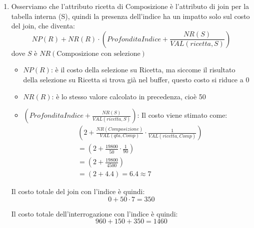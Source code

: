 \documentclass[a4paper]{article}
\begin{document}
\begin{exercise}
\begin{enumerate}
\begin{enumerate}
\begin{itemize}
            \item \( NP(S) \): è il numero di pagine del risultato della selezione su
              Composizione, che è 180
          \end{itemize}
          Il costo totale del join è quindi:
          \[
            0 + 50 \cdot 180 = 9000
          \] 
      \end{enumerate}
      Il costo totale della query è quindi la somma dei costi di ogni singola
      operazione:
      \[
        960 + 150 + 9000 = 10110
      \] 

    \item Osserviamo che l'attributo ricetta di Composizione è l'attributo
      di join per la tabella interna (S), quindi la presenza dell'indice
      ha un impatto solo sul costo del join, che diventa:
      \[
        NP(R) + NR(R) \cdot \left( ProfonditaIndice + \frac{NR(S)}{VAL(ricetta, S)} \right)
      \] 
      dove \( S \) è \( NR(\text{Composizione con selezione}) \) 
      \begin{itemize}
        \item \( NP(R) \): è il costo della selezione su Ricetta, ma siccome il risultato
          della selezione su Ricetta si trova già nel buffer, questo costo si riduce a 0

        \item \( NR(R) \): è lo stesso valore calcolato in precedenza, cioè 50

        \item \( \left( ProfonditaIndice + \frac{NR(S)}{VAL(ricetta, S)} \right) \):
          Il costo viene stimato come:
          \[
            \begin{aligned}
              &\left( 2 + \frac{NR(Composizione)}{VAL(qta, Comp)}
              \cdot \frac{1}{VAL(ricetta, Comp)} \right)\\
              &= \left( 2 + \frac{19800}{50} \cdot \frac{1}{90} \right) \\
              &= \left( 2 + \frac{19800}{4500} \right) \\
              &= \left( 2 + 4.4 \right) = 6.4 \approx 7
            \end{aligned}
          \] 
      \end{itemize}
      Il costo totale del join con l'indice è quindi:
      \[
        0 + 50 \cdot 7 = 350
      \]

      \vspace{1em}
      \noindent
      Il costo totale dell'interrogazione con l'indice è quindi:
      \[
        960 + 150 + 350 = 1460
      \]
  \end{enumerate}
\end{exercise}
\end{document}
